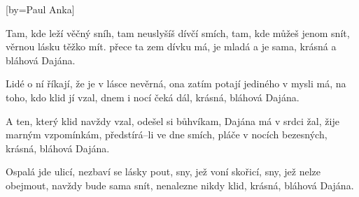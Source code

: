 [by={Paul Anka}]

\beginverse{}
Tam, kde leží věčný sníh, tam neuslyšíš dívčí smích,
tam, kde můžeš jenom snít, věrnou lásku těžko mít.
přece ta zem dívku má, je mladá a je sama,
krásná a bláhová Dajána.   
\endverse{}

\beginverse{}
Lidé o ní říkají, že je v lásce nevěrná,
ona zatím potají jediného v mysli má,
na toho, kdo klid jí vzal, dnem i nocí čeká dál,
krásná, bláhová Dajána.   
\endverse{}

\beginverse{}
A ten, který klid navždy vzal, odešel si bůhvíkam,
Dajána má v srdci žal, žije marným vzpomínkám,
předstírá--li ve dne smích, pláče v nocích bezesných,
krásná, bláhová Dajána.   
\endverse{}

\beginverse{}
Ospalá jde ulicí, nezbaví se lásky pout,
sny, jež voní skořicí, sny, jež nelze obejmout,
navždy bude sama snít, nenalezne nikdy klid,
krásná, bláhová Dajána.   
\endverse{}

\endsong{}
